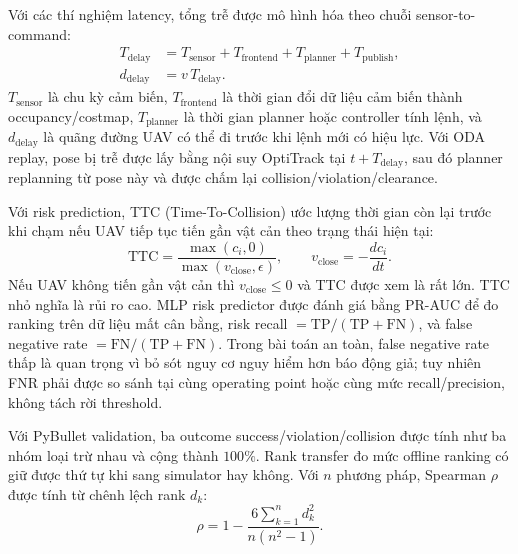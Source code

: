 \documentclass[10pt,letterpaper,twocolumn]{article}
\begin{document}
Với các thí nghiệm latency, tổng trễ được mô hình hóa theo chuỗi sensor-to-command:
\[
\begin{aligned}
  T_{\mathrm{delay}}&=T_{\mathrm{sensor}}+T_{\mathrm{frontend}}+T_{\mathrm{planner}}+T_{\mathrm{publish}},\\
  d_{\mathrm{delay}}&=v\,T_{\mathrm{delay}}.
\end{aligned}
\]
\(T_{\mathrm{sensor}}\) là chu kỳ cảm biến, \(T_{\mathrm{frontend}}\) là thời gian đổi dữ liệu cảm biến thành occupancy/costmap, \(T_{\mathrm{planner}}\) là thời gian planner hoặc controller tính lệnh, và \(d_{\mathrm{delay}}\) là quãng đường UAV có thể đi trước khi lệnh mới có hiệu lực. Với ODA replay, pose bị trễ được lấy bằng nội suy OptiTrack tại \(t+T_{\mathrm{delay}}\), sau đó planner replanning từ pose này và được chấm lại collision/violation/clearance.

Với risk prediction, TTC (Time-To-Collision) ước lượng thời gian còn lại trước khi chạm nếu UAV tiếp tục tiến gần vật cản theo trạng thái hiện tại:
\[
  \mathrm{TTC}=\frac{\max(c_i,0)}{\max(v_{\mathrm{close}},\epsilon)},\qquad
  v_{\mathrm{close}}=-\frac{dc_i}{dt}.
\]
Nếu UAV không tiến gần vật cản thì \(v_{\mathrm{close}}\le0\) và TTC được xem là rất lớn. TTC nhỏ nghĩa là rủi ro cao. MLP risk predictor được đánh giá bằng PR-AUC để đo ranking trên dữ liệu mất cân bằng, risk recall \(=\mathrm{TP}/(\mathrm{TP}+\mathrm{FN})\), và false negative rate \(=\mathrm{FN}/(\mathrm{TP}+\mathrm{FN})\). Trong bài toán an toàn, false negative rate thấp là quan trọng vì bỏ sót nguy cơ nguy hiểm hơn báo động giả; tuy nhiên FNR phải được so sánh tại cùng operating point hoặc cùng mức recall/precision, không tách rời threshold.

Với PyBullet validation, ba outcome success/violation/collision được tính như ba nhóm loại trừ nhau và cộng thành \(100\%\). Rank transfer đo mức offline ranking có giữ được thứ tự khi sang simulator hay không. Với \(n\) phương pháp, Spearman \(\rho\) được tính từ chênh lệch rank \(d_k\):
\[
  \rho=1-\frac{6\sum_{k=1}^{n}d_k^2}{n(n^2-1)}.
\]
\end{document}
